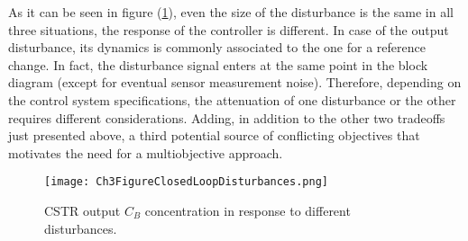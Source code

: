 As it can be seen in figure (\ref{ch3:fig:Ch3FigureClosedLoopDisturbances}), even the size of the disturbance is the same in all three situations, the response of the controller is different. In case of the output disturbance, its dynamics is commonly associated to the one for a reference change. In fact, the disturbance signal enters at the same point in the block diagram (except for eventual sensor measurement noise). Therefore, depending on the control system specifications, the attenuation of one disturbance or the other requires different considerations. Adding, in addition to the other two tradeoffs just presented above, a third potential source of conflicting objectives that motivates the need for a multiobjective approach.
%
\begin{figure}[tb]
    \begin{center}
        \texttt{[image: Ch3FigureClosedLoopDisturbances.png]}
        \caption{CSTR output $C_B$ concentration in response to different disturbances.}
        \label{ch3:fig:Ch3FigureClosedLoopDisturbances}
    \end{center}
\end{figure}
%

